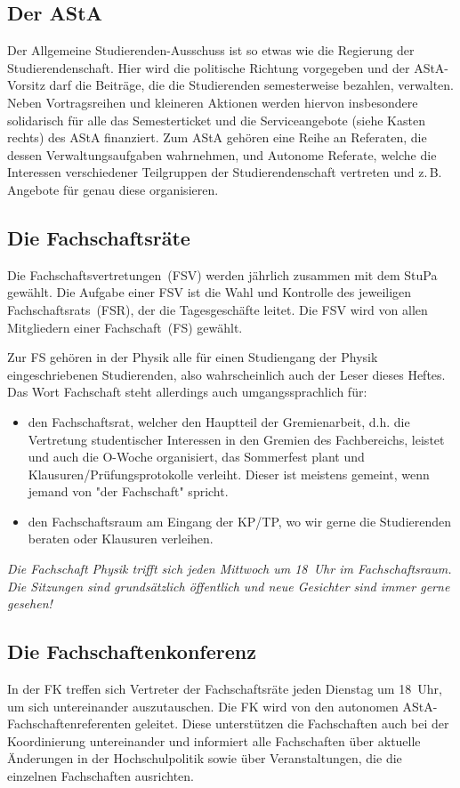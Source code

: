 \begin{multicols*}{2}
\subsection{Der AStA}
Der Allgemeine Studierenden-Ausschuss ist so etwas wie die Regierung der Studierendenschaft.
Hier wird die politische Richtung vorgegeben und der AStA-Vorsitz darf die Beiträge, die die Studierenden semesterweise bezahlen, verwalten.
Neben Vortragsreihen und kleineren Aktionen werden hiervon insbesondere solidarisch für alle das Semesterticket und die Serviceangebote (siehe Kasten rechts) des AStA finanziert. Zum AStA gehören eine Reihe an Referaten, die dessen Verwaltungsaufgaben wahrnehmen, und Autonome Referate, welche die Interessen verschiedener Teilgruppen der Studierendenschaft vertreten und z.\,B. Angebote für genau diese organisieren.

\subsection{Die Fachschaftsräte}
Die Fachschaftsvertretungen~(FSV) werden jährlich zusammen mit dem StuPa gewählt.
Die Aufgabe einer FSV ist die Wahl und Kontrolle des jeweiligen Fachschaftsrats~(FSR), der die Tagesgeschäfte leitet.
Die FSV wird von allen Mitgliedern einer Fachschaft~(FS) gewählt.

Zur FS gehören in der Physik alle für einen Studiengang der Physik eingeschriebenen Studierenden, also wahrscheinlich auch der Leser dieses Heftes.
Das Wort Fachschaft steht allerdings auch umgangssprachlich für:
\begin{itemize}
	\item den Fachschaftsrat, welcher den Hauptteil der Gremienarbeit, d.h. die Vertretung studentischer Interessen in den Gremien des Fachbereichs, leistet und auch die O-Woche organisiert, das Sommerfest plant und Klausuren/Prüfungsprotokolle verleiht.
Dieser ist meistens gemeint, wenn jemand von "der Fachschaft" spricht.
	\item den Fachschaftsraum am Eingang der KP/TP, wo wir gerne die Studierenden beraten oder Klausuren verleihen.
\end{itemize}
\emph{Die Fachschaft Physik trifft sich jeden Mittwoch um 18~Uhr im Fachschaftsraum.
Die Sitzungen sind grundsätzlich öffentlich und neue Gesichter sind immer gerne gesehen!}

\subsection{Die Fachschaftenkonferenz}
In der FK treffen sich Vertreter der Fachschaftsräte jeden Dienstag um 18~Uhr, um sich untereinander auszutauschen.
Die FK wird von den autonomen AStA-Fachschaftenreferenten geleitet.
Diese unterstützen die Fachschaften auch bei der Koordinierung untereinander und informiert alle Fachschaften über aktuelle Änderungen in der Hochschulpolitik sowie über Veranstaltungen, die die einzelnen Fachschaften ausrichten.

\end{multicols*}

